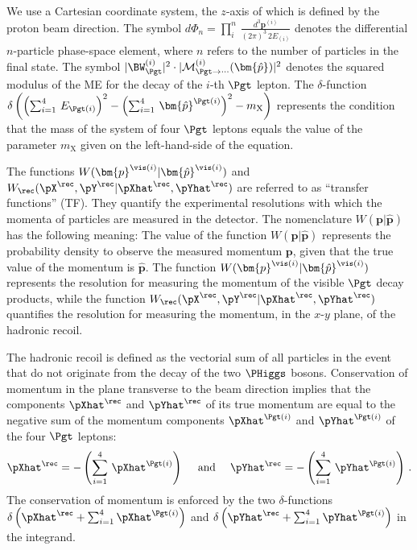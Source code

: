 We use a Cartesian coordinate system, the $z$-axis of which is defined by the proton beam direction.
The symbol $d\Phi_{n} = \prod_{i}^{n} \,
\frac{d^{3}\bm{p}^{(i)}}{(2\pi)^{3} \, 2 E_{(i)}}$ denotes the differential $n$-particle phase-space element,
where $n$ refers to the number of particles in the final state.
The symbol $\vert \BW^{(i)}_{\Pgt} \vert^{2} \cdot \vert \mathcal{M}^{(i)}_{\Pgt\to\cdots}(\bm{\hat{p}}) \vert^{2}$ 
denotes the squared modulus of the ME for the decay of the $i$-th $\Pgt$ lepton.
The $\delta$-function 
$\delta\left( \left(\sum_{i=1}^{4} \, E_{\Pgt(i)}\right)^{2} - \left(\sum_{i=1}^{4} \, \bm{\hat{p}}^{\Pgt(i)}\right)^{2} - m_{\textrm{X}} \right)$
represents the condition that the mass of the system of four $\Pgt$ leptons equals the value of the parameter $m_{\textrm{X}}$
given on the left-hand-side of the equation.

The functions $W(\bm{p}^{\vis(i)}|\bm{\hat{p}}^{\vis(i)})$ and $W_{\rec}( \pX^{\rec},\pY^{\rec} | \pXhat^{\rec},\pYhat^{\rec} )$ are referred to as ``transfer functions'' (TF).
They quantify the experimental resolutions with which the momenta of particles are measured in the detector.
The nomenclature $W(\bm{p}|\bm{\hat{p}})$ has the following meaning:
The value of the function $W(\bm{p}|\bm{\hat{p}})$ represents the probability density to observe the measured momentum $\bm{p}$,
given that the true value of the momentum is $\bm{\hat{p}}$.
The function $W(\bm{p}^{\vis(i)}|\bm{\hat{p}}^{\vis(i)})$ represents the resolution for measuring the momentum of the visible $\Pgt$ decay products,
while the function $W_{\rec}( \pX^{\rec},\pY^{\rec} | \pXhat^{\rec},\pYhat^{\rec} )$ quantifies the resolution for measuring the momentum, 
in the $x$-$y$ plane, of the hadronic recoil.

The hadronic recoil is defined as the vectorial sum of all particles in the event that do not originate from the decay of the two $\PHiggs$ bosons.
Conservation of momentum in the plane transverse to the beam direction implies that
the components $\pXhat^{\rec}$ and $\pYhat^{\rec}$ of its true momentum are equal to the negative sum of the momentum components
$\pXhat^{\Pgt(i)}$ and $\pYhat^{\Pgt(i)}$ of the four $\Pgt$ leptons:
\begin{equation*}
\pXhat^{\rec} = -\left( \sum_{i=1}^{4} \, \pXhat^{\Pgt(i)} \right) \quad \mbox{ and } \quad \pYhat^{\rec} = -\left( \sum_{i=1}^{4} \, \pYhat^{\Pgt(i)} \right) \, .
\end{equation*}
The conservation of momentum is enforced by the two $\delta$-functions
$\delta\left( \pXhat^{\rec} + \sum_{i=1}^{4} \pXhat^{\Pgt(i)} \right)$ and $\delta\left( \pYhat^{\rec} + \sum_{i=1}^{4} \pYhat^{\Pgt(i)} \right)$
in the integrand.

